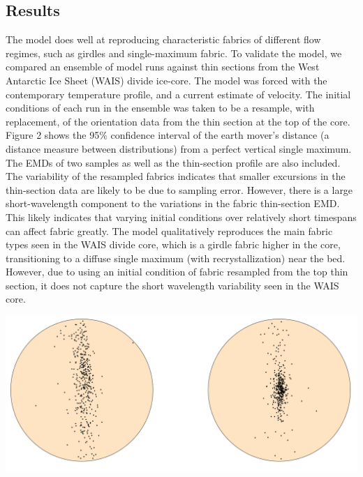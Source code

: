 \documentclass[a0,landscape]{a0poster}
\begin{document}
\begin{multicols}{3}
\subsection*{Results}
The model does well at reproducing characteristic fabrics of different flow regimes, such as girdles and single-maximum fabric. To validate the model, we compared an ensemble of model runs against thin sections from the West Antarctic Ice Sheet (WAIS) divide ice-core. The model was forced with the contemporary temperature profile, and a current estimate of velocity. The initial conditions of each run in the ensemble was taken to be a resample, with replacement, of the orientation data from the thin section at the top of the core. Figure 2 shows the 95\% confidence interval of the earth mover's distance (a distance measure between distributions) from a perfect vertical single maximum. The EMDs of two samples as well as the thin-section profile are also included. The variability of the resampled fabrics indicates that smaller excursions in the thin-section data are likely to be due to sampling error. However, there is a large short-wavelength component to the variations in the fabric thin-section EMD. This likely indicates that varying initial conditions over relatively short timespans can affect fabric greatly. The model qualitatively reproduces the main fabric types seen in the WAIS divide core, which is a girdle fabric higher in the core, transitioning to a diffuse single maximum (with recrystallization) near the bed. However, due to using an initial condition of fabric resampled from the top thin section, it does not capture the short wavelength variability seen in the WAIS core. 

\begin{center}\vspace{1cm}
\includegraphics[width=0.9\linewidth]{both}
\end{center}\vspace{1cm}


\end{multicols}
\end{document}

